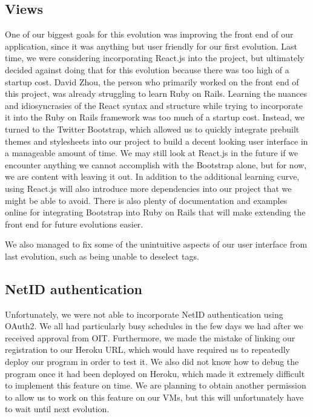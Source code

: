 \documentclass{article}
\begin{document}
\subsection{Views}
One of our biggest goals for this evolution was improving the front end of our application, since it was anything but user friendly for our first evolution.  Last time, we were considering incorporating React.js into the project, but ultimately decided against doing that for this evolution because there was too high of a startup cost.  David Zhou, the person who primarily worked on the front end of this project, was already struggling to learn Ruby on Rails.  Learning the nuances and idiosyncrasies of the React syntax and structure while trying to incorporate it into the Ruby on Rails framework was too much of a startup cost.  Instead, we turned to the Twitter Bootstrap, which allowed us to quickly integrate prebuilt themes and stylesheets into our project to build a decent looking user interface in a manageable amount of time.  We may still look at React.js in the future if we encounter anything we cannot accomplish with the Bootstrap alone, but for now, we are content with leaving it out.  In addition to the additional learning curve, using React.js will also introduce more dependencies into our project that we might be able to avoid.  There is also plenty of documentation and examples online for integrating Bootstrap into Ruby on Rails that will make extending the front end for future evolutions easier.\par
We also managed to fix some of the unintuitive aspects of our user interface from last evolution, such as being unable to deselect tags.
\subsection{NetID authentication}
Unfortunately, we were not able to incorporate NetID authentication using OAuth2.  We all had particularly busy schedules in the few days we had after we received approval from OIT.  Furthermore, we made the mistake of linking our registration to our Heroku URL, which would have required us to repeatedly deploy our program in order to test it.  We also did not know how to debug the program once it had been deployed on Heroku, which made it extremely difficult to implement this feature on time.  We are planning to obtain another permission to allow us to work on this feature on our VMs, but this will unfortunately have to wait until next evolution.
\end{document}
